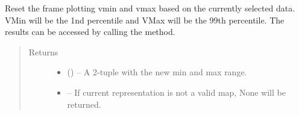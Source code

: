 \documentclass[letterpaper,10pt,english]{sphinxmanual}
\begin{document}
\begin{fulllineitems}

\begin{fulllineitems}
\label{\detokenize{xanespy:xanespy.qt_frameset_presenter.QtFramesetPresenter.process_events}}
\end{fulllineitems}


\begin{fulllineitems}
\label{\detokenize{xanespy:xanespy.qt_frameset_presenter.QtFramesetPresenter.refresh_frames}}
\end{fulllineitems}


\begin{fulllineitems}
\label{\detokenize{xanespy:xanespy.qt_frameset_presenter.QtFramesetPresenter.reset_frame_range}}
Reset the frame plotting vmin and vmax based on the currently
selected data. VMin will be the 1nd percentile and VMax will
be the 99th percentile. The results can be accessed by calling
the  method.
\begin{quote}\begin{description}
\item[{Returns}] \leavevmode
\begin{itemize}
\item {} 
 () -- A 2-tuple with the new min and max range.

\item {} 
 -- If current representation is not a valid map, None will be
returned.

\end{itemize}


\end{description}\end{quote}

\end{fulllineitems}



\end{fulllineitems}
\end{document}
